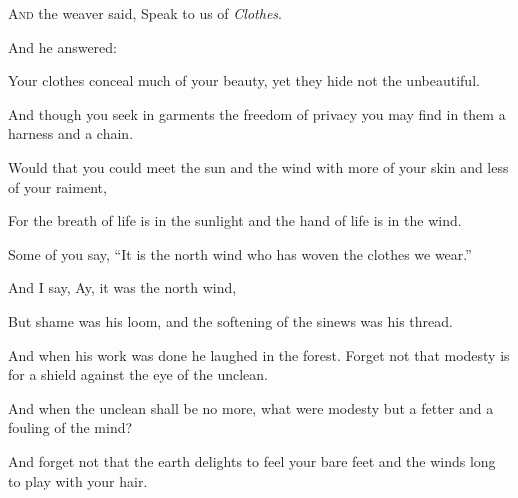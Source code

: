 
\lettrine{A}{nd} the weaver said, Speak to us of
\textit{Clothes}.

\medskip
And he answered:

Your clothes conceal much of your
beauty, yet they hide not the
unbeautiful.

And though you seek in garments the
freedom of privacy you may find in them
a harness and a chain.

Would that you could meet the sun and
the wind with more of your skin and less
of your raiment,

For the breath of life is in the
sunlight and the hand of life is in the
wind.

Some of you say, \enquote{It is the north wind
who has woven the clothes we wear.}

And I say, Ay, it was the north wind,

But shame was his loom, and the
softening of the sinews was his thread.

And when his work was done he laughed in
the forest. Forget not that modesty
is for a shield against the eye of the
unclean.

And when the unclean shall be no more,
what were modesty but a fetter and a
fouling of the mind?

And forget not that the earth delights
to feel your bare feet and the winds
long to play with your hair.
